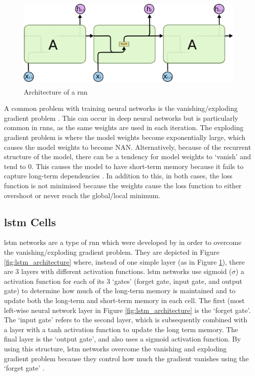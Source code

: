 \begin{figure}[h]
    \centering
    \includegraphics[height=4.5cm,trim={0 0 0cm 0cm},clip]{Paper/images/rnn.png}
    \caption{Architecture of a \acrlong{rnn} \citep{olah2015understanding}}
    \label{fig:rnn_architecture}
\end{figure}

A common problem with training neural networks is the vanishing/exploding gradient problem \citep{hochreiter1997long}. This can occur in deep neural networks but is particularly common in \acrshort{rnn}s, as the same weights are used in each iteration. The exploding gradient problem is where the model weights become exponentially large, which causes the model weights to become NAN. Alternatively, because of the recurrent structure of the model, there can be a tendency for model weights to `vanish' and tend to 0. This causes the model to have short-term memory because it fails to capture long-term dependencies \citep{chung2014empirical}. In addition to this, in both cases, the loss function is not minimised because the weights cause the loss function to either overshoot or never reach the global/local minimum.

\subsection{\acrlong{lstm} Cells}
\label{sec:background_lstms}

\acrshort{lstm} networks are a type of \acrlong{rnn} which were developed by \citet{hochreiter1997long} in order to overcome the vanishing/exploding gradient problem. They are depicted in Figure \ref{fig:lstm_architecture} where, instead of one simple layer (as in Figure \ref{fig:rnn_architecture}), there are 3 layers with different activation functions. \acrshort{lstm} networks use sigmoid ($\sigma$) a activation function for each of its 3 `gates' (forget gate, input gate, and output gate) to determine how much of the long-term memory is maintained and to update both the long-term and short-term memory in each cell. The first (most left-wise neural network layer in Figure \ref{fig:lstm_architecture} is the `forget gate'. The `input gate' refers to the second layer, which is subsequently combined with a layer with a tanh activation function to update the long term memory. The final layer is the `output gate', and also uses a sigmoid activation function. By using this structure, \acrshort{lstm} networks overcome the vanishing and exploding gradient problem because they control how much the gradient vanishes using the `forget gate' \citep{Gers}.

